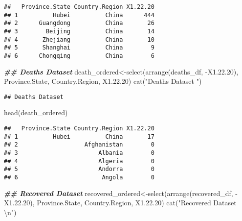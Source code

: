 \documentclass[
]{article}
\newenvironment{Shaded}{\begin{snugshade}}{\end{snugshade}}
\newcommand{\DocumentationTok}[1]{\textcolor[rgb]{0.56,0.35,0.01}{\textbf{\textit{#1}}}}
\newcommand{\FloatTok}[1]{\textcolor[rgb]{0.00,0.00,0.81}{#1}}
\newcommand{\FunctionTok}[1]{\textcolor[rgb]{0.00,0.00,0.00}{#1}}
\newcommand{\NormalTok}[1]{#1}
\newcommand{\OtherTok}[1]{\textcolor[rgb]{0.56,0.35,0.01}{#1}}
\newcommand{\SpecialCharTok}[1]{\textcolor[rgb]{0.00,0.00,0.00}{#1}}
\newcommand{\StringTok}[1]{\textcolor[rgb]{0.31,0.60,0.02}{#1}}
\begin{document}
\begin{verbatim}
##   Province.State Country.Region X1.22.20
## 1          Hubei          China      444
## 2      Guangdong          China       26
## 3        Beijing          China       14
## 4       Zhejiang          China       10
## 5       Shanghai          China        9
## 6      Chongqing          China        6
\end{verbatim}

\begin{Shaded}
\begin{Highlighting}[]
\DocumentationTok{\#\# Deaths Dataset}
\NormalTok{death\_ordered}\OtherTok{\textless{}{-}}\FunctionTok{select}\NormalTok{(}\FunctionTok{arrange}\NormalTok{(deaths\_df, }\SpecialCharTok{{-}}\NormalTok{X1.}\FloatTok{22.20}\NormalTok{), }
\NormalTok{                      Province.State, Country.Region, X1.}\FloatTok{22.20}\NormalTok{)}
\FunctionTok{cat}\NormalTok{(}\StringTok{"Deaths Dataset "}\NormalTok{)}
\end{Highlighting}
\end{Shaded}

\begin{verbatim}
## Deaths Dataset
\end{verbatim}

\begin{Shaded}
\begin{Highlighting}[]
\FunctionTok{head}\NormalTok{(death\_ordered)}
\end{Highlighting}
\end{Shaded}

\begin{verbatim}
##   Province.State Country.Region X1.22.20
## 1          Hubei          China       17
## 2                   Afghanistan        0
## 3                       Albania        0
## 4                       Algeria        0
## 5                       Andorra        0
## 6                        Angola        0
\end{verbatim}

\begin{Shaded}
\begin{Highlighting}[]
\DocumentationTok{\#\# Recovered Dataset}
\NormalTok{recovered\_ordered}\OtherTok{\textless{}{-}}\FunctionTok{select}\NormalTok{(}\FunctionTok{arrange}\NormalTok{(recovered\_df, }\SpecialCharTok{{-}}\NormalTok{X1.}\FloatTok{22.20}\NormalTok{), }
\NormalTok{                          Province.State, Country.Region, X1.}\FloatTok{22.20}\NormalTok{)}
\FunctionTok{cat}\NormalTok{(}\StringTok{"Recovered Dataset }\SpecialCharTok{\textbackslash{}n}\StringTok{"}\NormalTok{)}
\end{Highlighting}
\end{Shaded}
\end{document}
